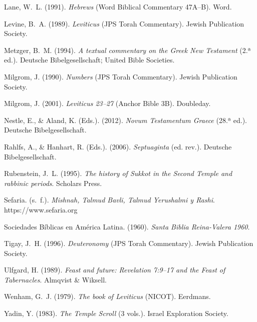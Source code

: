 \documentclass[11pt,letterpaper]{article}
\newcommand{\refapa}[1]{\par{\RaggedRight\hangindent=1.27cm\hangafter=1\noindent #1\par}\vspace{4pt}}
\begin{document}
\refapa{Lane, W.~L. (1991). \emph{Hebrews} (Word Biblical Commentary 47A--B). Word.}
\refapa{Levine, B.~A. (1989). \emph{Leviticus} (JPS Torah Commentary). Jewish Publication Society.}
\refapa{Metzger, B.~M. (1994). \emph{A textual commentary on the Greek New Testament} (2.ª ed.). Deutsche Bibelgesellschaft; United Bible Societies.}
\refapa{Milgrom, J. (1990). \emph{Numbers} (JPS Torah Commentary). Jewish Publication Society.}
\refapa{Milgrom, J. (2001). \emph{Leviticus 23--27} (Anchor Bible 3B). Doubleday.}
\refapa{Nestle, E., \& Aland, K. (Eds.). (2012). \emph{Novum Testamentum Graece} (28.ª ed.). Deutsche Bibelgesellschaft.}
\refapa{Rahlfs, A., \& Hanhart, R. (Eds.). (2006). \emph{Septuaginta} (ed. rev.). Deutsche Bibelgesellschaft.}
\refapa{Rubenstein, J.~L. (1995). \emph{The history of Sukkot in the Second Temple and rabbinic periods}. Scholars Press.}
\refapa{Sefaria. (s.~f.). \emph{Mishnah, Talmud Bavli, Talmud Yerushalmi y Rashi}. https://www.sefaria.org}
\refapa{Sociedades Bíblicas en América Latina. (1960). \emph{Santa Biblia Reina-Valera 1960}.}
\refapa{Tigay, J.~H. (1996). \emph{Deuteronomy} (JPS Torah Commentary). Jewish Publication Society.}
\refapa{Ulfgard, H. (1989). \emph{Feast and future: Revelation 7:9--17 and the Feast of Tabernacles}. Almqvist \& Wiksell.}
\refapa{Wenham, G.~J. (1979). \emph{The book of Leviticus} (NICOT). Eerdmans.}
\refapa{Yadin, Y. (1983). \emph{The Temple Scroll} (3 vols.). Israel Exploration Society.}
\end{document}
